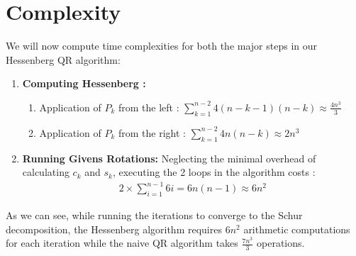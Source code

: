 \section{Complexity}
We will now compute time complexities for both the major steps in our Hessenberg QR algorithm:
\begin{enumerate}
    \item \textbf{Computing Hessenberg :}
        \begin{enumerate}
            \item Application of $P_k$ from the left :
            $\sum_{k=1}^{n-2}4(n-k-1)(n-k) \approx \frac{4n^3}{3}$ 
            \item Application of $P_k$ from the right :
            $\sum_{k=1}^{n-2}4n(n-k) \approx 2n^3$
        \end{enumerate}

    \item \textbf{Running Givens Rotations: }
    Neglecting the minimal overhead of calculating $c_k$ and $s_k$, executing the 2 loops in the algorithm costs :
    \begin{align}
        2\times\sum_{i=1}^{n-1}6i = 6n(n-1)\approx 6n^2
    \end{align}
\end{enumerate}

As we can see, while running the iterations to converge to the Schur decomposition, the Hessenberg algorithm requires $6n^2$ arithmetic computations for each iteration while the naive QR algorithm takes $\frac{7n^3}{3}$ operations.

